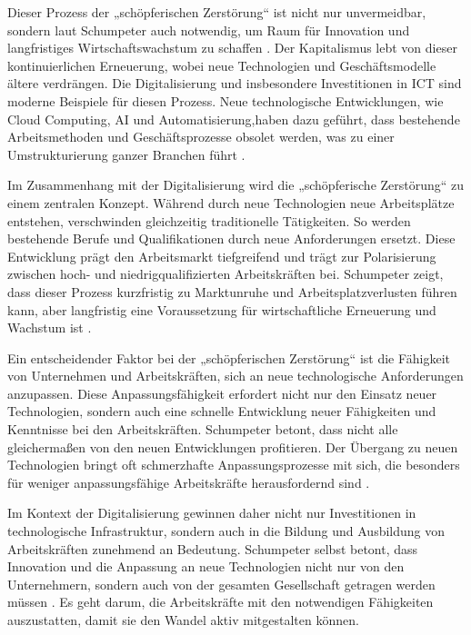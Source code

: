 Dieser Prozess der „schöpferischen Zerstörung“ ist nicht nur unvermeidbar, sondern laut 
Schumpeter auch notwendig, um Raum für Innovation und langfristiges Wirtschaftswachstum zu 
schaffen \parencite[vgl.][S. 87]{schumpeter1976capitalism}. Der Kapitalismus lebt von dieser 
kontinuierlichen Erneuerung, wobei neue Technologien und Geschäftsmodelle ältere verdrängen. 
Die Digitalisierung und insbesondere Investitionen in \ac{ICT} sind moderne Beispiele für 
diesen Prozess. Neue technologische Entwicklungen, wie Cloud Computing, \ac{AI} und 
Automatisierung,haben dazu geführt, dass bestehende Arbeitsmethoden und Geschäftsprozesse 
obsolet werden, was zu einer Umstrukturierung ganzer Branchen führt 
\parencite[vgl.][S. 110]{schumpeter1976capitalism}.

Im Zusammenhang mit der Digitalisierung wird die „schöpferische Zerstörung“ zu einem 
zentralen Konzept. Während durch neue Technologien neue Arbeitsplätze entstehen, verschwinden 
gleichzeitig traditionelle Tätigkeiten. So werden bestehende Berufe und Qualifikationen 
durch neue Anforderungen ersetzt. Diese Entwicklung prägt den Arbeitsmarkt tiefgreifend und 
trägt zur Polarisierung zwischen hoch- und niedrigqualifizierten Arbeitskräften bei. 
Schumpeter zeigt, dass dieser Prozess kurzfristig zu Marktunruhe und Arbeitsplatzverlusten 
führen kann, aber langfristig eine Voraussetzung für wirtschaftliche Erneuerung und Wachstum 
ist \parencite[vgl.][S. 110–111]{schumpeter1976capitalism}.

Ein entscheidender Faktor bei der „schöpferischen Zerstörung“ ist die Fähigkeit von 
Unternehmen und Arbeitskräften, sich an neue technologische Anforderungen anzupassen. Diese 
Anpassungsfähigkeit erfordert nicht nur den Einsatz neuer Technologien, sondern auch eine 
schnelle Entwicklung neuer Fähigkeiten und Kenntnisse bei den Arbeitskräften. Schumpeter 
betont, dass nicht alle gleichermaßen von den neuen Entwicklungen profitieren. Der Übergang 
zu neuen Technologien bringt oft schmerzhafte Anpassungsprozesse mit sich, die besonders für 
weniger anpassungsfähige Arbeitskräfte herausfordernd sind 
\parencite[vgl.][S. 110–111]{schumpeter1976capitalism}.

Im Kontext der Digitalisierung gewinnen daher nicht nur Investitionen in technologische 
Infrastruktur, sondern auch in die Bildung und Ausbildung von Arbeitskräften zunehmend an 
Bedeutung. Schumpeter selbst betont, dass Innovation und die Anpassung an neue Technologien 
nicht nur von den Unternehmern, sondern auch von der gesamten Gesellschaft getragen werden 
müssen \parencite[vgl.][S. 132]{schumpeter1976capitalism}. Es geht darum, die Arbeitskräfte mit 
den notwendigen Fähigkeiten auszustatten, damit sie den Wandel aktiv mitgestalten können. 

